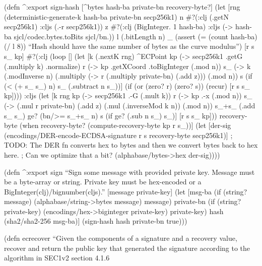 \documentclass[
]{article}
\begin{document}
(defn \^{}:export sign-hash {[}\^{}bytes hash-ba private-bn
recovery-byte?{]} (let {[}rng (deterministic-generate-k hash-ba
private-bn secp256k1) n \#?(:clj (.getN secp256k1) :cljs (.-r
secp256k1)) z \#?(:clj (BigInteger. 1 hash-ba) :cljs (-\textgreater{}
hash-ba sjcl/codec.bytes.toBits sjcl/bn.)) l (.bitLength n) \_ (assert
(= (count hash-ba) (/ l 8)) ``Hash should have the same number of bytes
as the curve modulus'') {[}r s s\_ kp{]} \#?(:clj (loop {[}{]} (let {[}k
(.nextK rng) \^{}ECPoint kp (-\textgreater{} secp256k1 .getG (.multiply
k) .normalize) r (-\textgreater{} kp .getXCoord .toBigInteger (.mod n))
s\_ (-\textgreater{} k (.modInverse n) (.multiply (-\textgreater{} r
(.multiply private-bn) (.add z))) (.mod n)) s (if (\textless{} (+ s\_
s\_) n) s\_ (.subtract n s\_)){]} (if (or (zero? r) (zero? s)) (recur)
{[}r s s\_ kp{]}))) :cljs (let {[}k rng kp (-\textgreater{} secp256k1
.-G (.mult k)) r (-\textgreater{} kp .-x (.mod n)) s\_ (-\textgreater{}
(.mul r private-bn) (.add z) (.mul (.inverseMod k n)) (.mod n)) s\_+s\_
(.add s\_ s\_) ge? (bn/\textgreater= s\_+s\_ n) s (if ge? (.sub n s\_)
s\_){]} {[}r s s\_ kp{]})) recovery-byte (when recovery-byte?
(compute-recovery-byte kp r s\_)){]} (let {[}der-sig
(encodings/DER-encode-ECDSA-signature r s recovery-byte secp256k1){]} ;
TODO: The DER fn converts hex to bytes and then we convert bytes back to
hex here. ; Can we optimize that a bit?
(alphabase/bytes-\textgreater hex der-sig))))

(defn \^{}:export sign ``Sign some message with provided private key.
Message must be a byte-array or string. Private key must be hex-encoded
or a BigInteger(clj)/bignumber(cljs).'' {[}message private-key{]} (let
{[}msg-ba (if (string? message) (alphabase/string-\textgreater bytes
message) message) private-bn (if (string? private-key)
(encodings/hex-\textgreater biginteger private-key) private-key) hash
(sha2/sha2-256 msg-ba){]} (sign-hash hash private-bn true)))

(defn ecrecover ``Given the components of a signature and a recovery
value, recover and return the public key that generated the signature
according to the algorithm in SEC1v2 section 4.1.6
\end{document}
